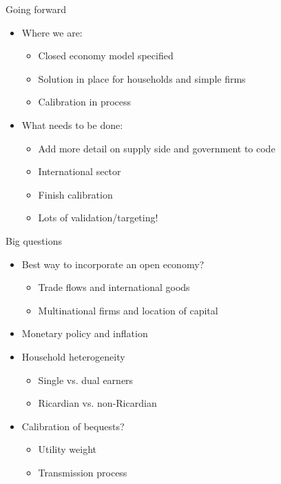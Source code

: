 \documentclass{beamer}
\begin{document}
  
    \begin{frame}{Going forward}
  \begin{itemize}
  \item Where we are:
  	\begin{itemize}
      	\item Closed economy model specified
	\item Solution in place for households and simple firms
      	\item Calibration in process
  	\end{itemize}
 \item What needs to be done:
 	\begin{itemize}
	\item Add more detail on supply side and government to code
	\item International sector
	\item Finish calibration
	\item Lots of validation/targeting!
	\end{itemize}
 \end{itemize}
  \end{frame}
  
      \begin{frame}{Big questions}
  \begin{itemize}
\item Best way to incorporate an open economy?
	\begin{itemize}
	\item Trade flows and international goods
	\item Multinational firms and location of capital
	\end{itemize}
\item Monetary policy and inflation
\item Household heterogeneity
	\begin{itemize}
	\item Single vs. dual earners
	\item Ricardian vs. non-Ricardian
	\end{itemize}
\item Calibration of bequests?
	\begin{itemize}
	\item Utility weight
	\item Transmission process
	\end{itemize}
\end{itemize}
\end{frame}
\end{document}
